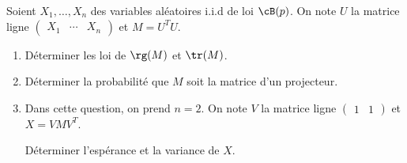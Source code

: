 \begin{enonce}
\begin{exercise}[ID={RMS135 E981},subtitle={Mines-Ponts PSI 2024},tags={oraux},difficulty={}]
  Soient $X_1,\dots,X_n$ des variables aléatoires i.i.d de loi $\cB(p)$.
  On note $U$ la matrice ligne $\begin{pmatrix} X_1& \cdots & X_n \end{pmatrix}$ et $M = U^T U$.

  \begin{enumerate}
    \item Déterminer les loi de $\rg(M)$ et $\tr(M)$.
    \item Déterminer la probabilité que $M$ soit la matrice d'un projecteur.

    \item Dans cette question, on prend $n=2$.
      On note $V$ la matrice ligne $\begin{pmatrix} 1&1 \end{pmatrix}$ et $X = V M V^T$.

        Déterminer l'espérance et la variance de $X$.
  \end{enumerate}
\end{exercise}
\begin{solution}
\end{solution}
\end{enonce}
